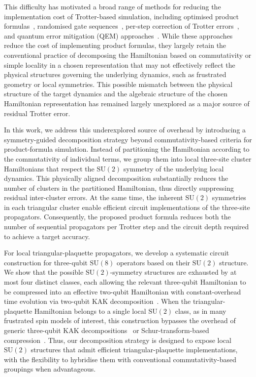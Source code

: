 \documentclass[aps,showpacs,amsmath,amssymb,twocolumn,prx,longbibliography,superscriptaddress,notitlepage,floatfix,10pt]{revtex4-2}
\begin{document}
This difficulty has motivated a broad range of methods for reducing the implementation cost of Trotter-based simulation, including optimised product formulas~\cite{Somma2016A, Su2021Nearly, Stryker2025Shearing, Yuan2021Quantum}, randomised gate sequences~\cite{Childs2019Faster, Campbell2019Random, Yang2023Randomized, Kiumi2025TE-PAI}, per-step correction of Trotter errors~\cite{Tran2021Faster, Zeng2025Simple}, and quantum error mitigation (QEM) approaches~\cite{Endo2019Mitigating, Hakkaku2025Data-Efficient}.
While these approaches reduce the cost of implementing product formulas, they largely retain the conventional practice of decomposing the Hamiltonian based on commutativity or simple locality in a chosen representation that may not effectively reflect the physical structures governing the underlying dynamics, such as frustrated geometry or local symmetries.
This possible mismatch between the physical structure of the target dynamics and the algebraic structure of the chosen Hamiltonian representation has remained largely unexplored as a major source of residual Trotter error.

In this work, we address this underexplored source of overhead by introducing a symmetry-guided decomposition strategy beyond commutativity-based criteria for product-formula simulation.
Instead of partitioning the Hamiltonian according to the commutativity of individual terms, we group them into local three-site cluster Hamiltonians that respect the $\mathrm{SU}(2)$ symmetry of the underlying local dynamics.
This physically aligned decomposition substantially reduces the number of clusters in the partitioned Hamiltonian, thus directly suppressing residual inter-cluster errors.
At the same time, the inherent $\mathrm{SU}(2)$ symmetries in each triangular cluster enable efficient circuit implementations of the three-site propagators.
Consequently, the proposed product formula reduces both the number of sequential propagators per Trotter step and the circuit depth required to achieve a target accuracy.

For local triangular-plaquette propagators, we develop a systematic circuit construction for three-qubit $\mathrm{SU}(8)$ operators based on their $\mathrm{SU}(2)$ structure.
We show that the possible $\mathrm{SU}(2)$-symmetry structures are exhausted by at most four distinct classes, each allowing the relevant three-qubit Hamiltonian to be compressed into an effective two-qubit Hamiltonian with constant-overhead time evolution via two-qubit KAK decomposition~\cite{KAK, KAK1, KAK2, KAK3}.
When the triangular-plaquette Hamiltonian belongs to a single local $\mathrm{SU}(2)$ class, as in many frustrated spin models of interest, this construction bypasses the overhead of generic three-qubit KAK decompositions~\cite{Krol2024Beyond} or Schur-transform-based compression~\cite{Bacon2006Efficient, Nguyen2023The}.
Thus, our decomposition strategy is designed to expose local $\mathrm{SU}(2)$ structures that admit efficient triangular-plaquette implementations, with the flexibility to hybridise them with conventional commutativity-based groupings when advantageous.
\end{document}

